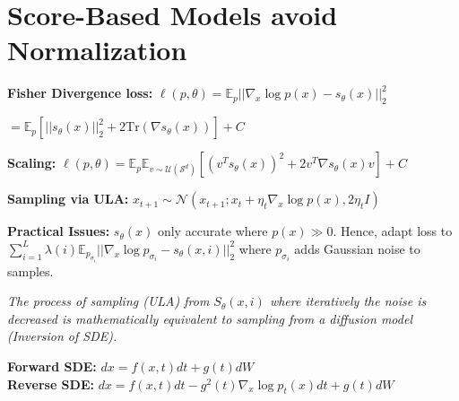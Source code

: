 \columnbreak

\section*{Score-Based Models avoid Normalization}
\textbf{Fisher Divergence loss:} $\ell(p,\theta) = \mathbb E_{p} ||\nabla_x \log p(x) - s_\theta(x) ||_2^2$

\hfill $= \mathbb E_p [||s_\theta(x)||_2^2 + 2 \text{Tr}( \nabla s_\theta(x) )] + C$

\textbf{Scaling:} $\ell(p,\theta) = \mathbb E_p \mathbb E_{v \sim \mathcal{U}(\mathcal{S}^d)}[(v^T\!\! s_\theta(x))^2 + 2 v^T\!\! \nabla s_\theta(x) v] + C$

\textbf{Sampling via ULA:} $x_{t+1} \sim \mathcal{N}(x_{t+1} ; x_t + \eta_t \nabla_x \log p(x), 2 \eta_t I)$

\textbf{Practical Issues:} \(s_\theta(x)\) only accurate where \(p(x) \gg 0\). Hence, adapt loss to
$\sum_{i=1}^L \lambda(i) \mathbb{E}_{p_{\sigma_i}}|| \nabla_x \log p_{\sigma_i} - s_\theta(x,i)||_2^2$ where $p_{\sigma_i}$ adds Gaussian noise to samples. 

\textit{The process of sampling (ULA) from \(S_\theta(x,i)\) where iteratively the noise is decreased is mathematically equivalent to sampling from a diffusion model (Inversion of SDE).}

\textbf{Forward SDE:} $dx = f(x,t) dt + g(t) dW$\\ 
\textbf{Reverse SDE:} $dx = f(x,t) dt - g^2(t) \nabla_x \log p_t(x) dt + g(t) dW$